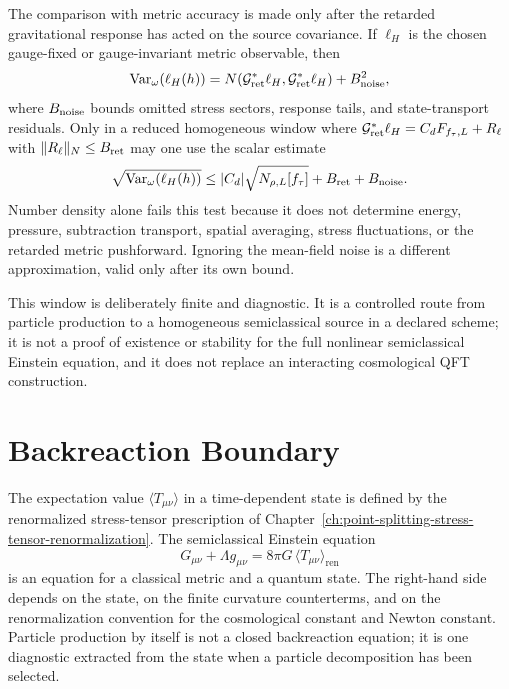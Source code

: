 \begin{controlledapproximation}
The comparison with metric accuracy is made only after the retarded
gravitational response has acted on the source covariance.  If \(\ell_H\) is the
chosen gauge-fixed or gauge-invariant metric observable, then
\begin{equation}
  \operatorname{Var}_\omega(\ell_H(h))
  =
  N(\mathcal G_{\rm ret}^*\ell_H,\mathcal G_{\rm ret}^*\ell_H)
  +B_{\rm noise}^{2},
  \label{eq:cosmology-retarded-metric-noise}
\end{equation}
where \(B_{\rm noise}\) bounds omitted stress sectors, response tails, and
state-transport residuals.  Only in a reduced homogeneous window where
\(\mathcal G_{\rm ret}^*\ell_H=C_dF_{f_\tau,L}+R_\ell\) with
\(\|R_\ell\|_N\le B_{\rm ret}\) may one use the scalar estimate
\[
  \sqrt{\operatorname{Var}_\omega(\ell_H(h))}
  \le
  |C_d|\sqrt{N_{\rho,L}[f_\tau]}+B_{\rm ret}+B_{\rm noise}.
\]
Number density alone fails this test because it does not determine energy,
pressure, subtraction transport, spatial averaging, stress fluctuations, or the
retarded metric pushforward.  Ignoring the mean-field noise is a different
approximation, valid only after its own bound.

This window is deliberately finite and diagnostic.  It is a controlled route
from particle production to a homogeneous semiclassical source in a declared
scheme; it is not a proof of existence or stability for the full nonlinear
semiclassical Einstein equation, and it does not replace an interacting
cosmological QFT construction.
\end{controlledapproximation}

\section{Backreaction Boundary}

The expectation value \(\langle T_{\mu\nu}\rangle\) in a time-dependent state
is defined by the renormalized stress-tensor prescription of
Chapter~\ref{ch:point-splitting-stress-tensor-renormalization}.  The
semiclassical Einstein equation
\begin{equation}
  G_{\mu\nu}+\Lambda g_{\mu\nu}
  =
  8\pi G\,\langle T_{\mu\nu}\rangle_{\mathrm{ren}}
  \label{eq:semiclassical-einstein-cosmology}
\end{equation}
is an equation for a classical metric and a quantum state.  The right-hand
side depends on the state, on the finite curvature counterterms, and on the
renormalization convention for the cosmological constant and Newton
constant.  Particle production by itself is not a closed backreaction
equation; it is one diagnostic extracted from the state when a particle
decomposition has been selected.


